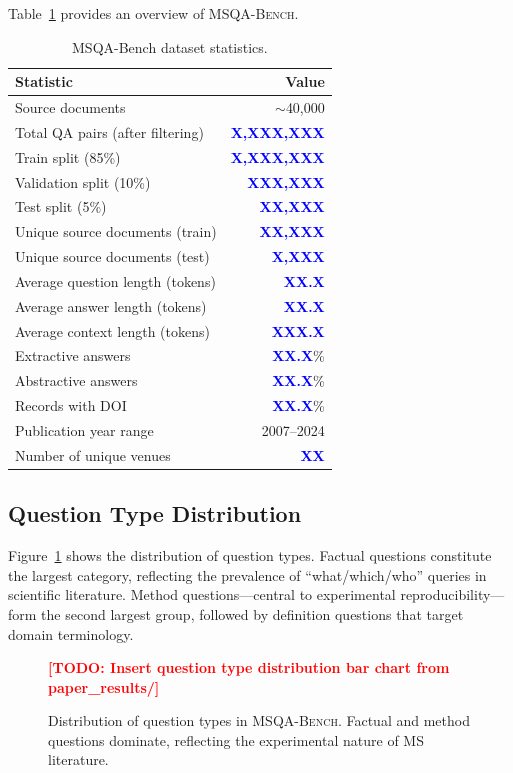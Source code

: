 \documentclass[11pt]{article}
\newcommand{\msqa}{\textsc{MSQA-Bench}}
\newcommand{\todo}[1]{\textcolor{red}{\textbf{[TODO: #1]}}}
\newcommand{\placeholder}[1]{\textcolor{blue}{\textbf{#1}}}
\begin{document}
Table~\ref{tab:dataset_stats} provides an overview of \msqa{}.

\begin{table}[t]
\caption{MSQA-Bench dataset statistics.}
\label{tab:dataset_stats}
\centering
\small
\begin{tabular}{lr}
\toprule
\textbf{Statistic} & \textbf{Value} \\
\midrule
Source documents & $\sim$40,000 \\
Total QA pairs (after filtering) & \placeholder{X,XXX,XXX} \\
\quad Train split (85\%) & \placeholder{X,XXX,XXX} \\
\quad Validation split (10\%) & \placeholder{XXX,XXX} \\
\quad Test split (5\%) & \placeholder{XX,XXX} \\
Unique source documents (train) & \placeholder{XX,XXX} \\
Unique source documents (test) & \placeholder{X,XXX} \\
\midrule
Average question length (tokens) & \placeholder{XX.X} \\
Average answer length (tokens) & \placeholder{XX.X} \\
Average context length (tokens) & \placeholder{XXX.X} \\
\midrule
Extractive answers & \placeholder{XX.X}\% \\
Abstractive answers & \placeholder{XX.X}\% \\
\midrule
Records with DOI & \placeholder{XX.X}\% \\
Publication year range & 2007--2024 \\
Number of unique venues & \placeholder{XX} \\
\bottomrule
\end{tabular}
\end{table}

\subsection{Question Type Distribution}

Figure~\ref{fig:question_types} shows the distribution of question types. Factual questions constitute the largest category, reflecting the prevalence of ``what/which/who'' queries in scientific literature. Method questions---central to experimental reproducibility---form the second largest group, followed by definition questions that target domain terminology.

\begin{figure}[t]
\centering
\todo{Insert question type distribution bar chart from paper\_results/}
\caption{Distribution of question types in \msqa{}. Factual and method questions dominate, reflecting the experimental nature of MS literature.}
\label{fig:question_types}
\end{figure}
\end{document}
